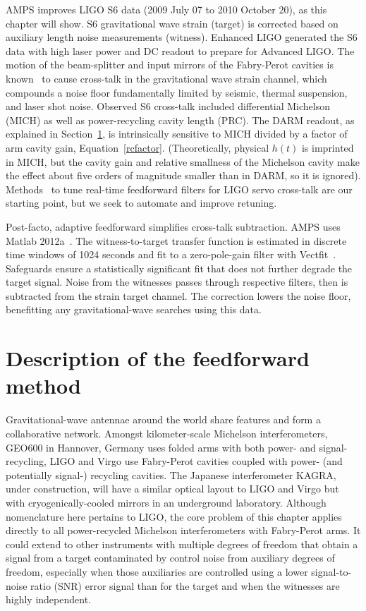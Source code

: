 AMPS improves LIGO S6 data (2009 July 07 to 2010 October 20), as this chapter will show. S6 gravitational wave strain (target) is corrected based on auxiliary length noise measurements (witness). Enhanced LIGO generated the S6 data with high laser power and DC readout to prepare for Advanced LIGO. The motion of the beam-splitter and input mirrors of the Fabry-Perot cavities is known~\cite{AdhikariThesis,BallmerThesis} to cause cross-talk in the gravitational wave strain channel, which compounds a noise floor fundamentally limited by seismic, thermal suspension, and laser shot noise. Observed S6 cross-talk included differential Michelson (MICH) as well as power-recycling cavity length (PRC). The DARM readout, as explained in Section~\ref{motive_math}, is intrinsically sensitive to MICH divided by a factor of arm cavity gain, Equation~\ref{rcfactor}. (Theoretically, physical $h(t)$ is imprinted in MICH, but the cavity gain and relative smallness of the Michelson cavity make the effect about five orders of magnitude smaller than in DARM, so it is ignored). Methods~\cite{KisselThesis} to tune real-time feedforward filters for LIGO servo cross-talk are our starting point, but we seek to automate and improve retuning.

Post-facto, adaptive feedforward simplifies cross-talk subtraction. AMPS uses Matlab 2012a~\cite{Matlab2012a}. The witness-to-target transfer function is estimated in discrete time windows of 1024 seconds and fit to a zero-pole-gain filter with Vectfit~\cite{Deschrijver2008,Gustavsen1999,Gustavsen2006}. Safeguards ensure a statistically significant fit that does not further degrade the target signal. Noise from the witnesses passes through respective filters, then is subtracted from the strain target channel. The correction lowers the noise floor, benefitting any gravitational-wave searches using this data.


    \section{Description of the feedforward method}
    \label{motive_math}


Gravitational-wave antennae around the world share features and form a collaborative network. Amongst kilometer-scale Michelson interferometers, GEO600 in Hannover, Germany uses folded arms with both power- and signal-recycling, LIGO and Virgo use Fabry-Perot cavities coupled with power- (and potentially signal-) recycling cavities. The Japanese interferometer KAGRA, under construction, will have a similar optical layout to LIGO and Virgo but with cryogenically-cooled mirrors in an underground laboratory. Although nomenclature here pertains to LIGO, the core problem of this chapter applies directly to all power-recycled Michelson interferometers with Fabry-Perot arms. It could extend to other instruments with multiple degrees of freedom that obtain a signal from a target contaminated by control noise from auxiliary degrees of freedom, especially when those auxiliaries are controlled using a lower signal-to-noise ratio (SNR) error signal than for the target and when the witnesses are highly independent.

